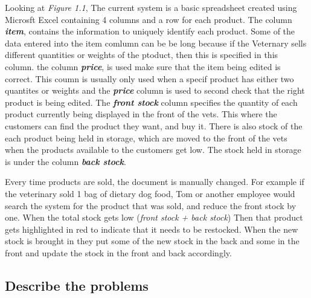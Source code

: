 \begin{flushleft}
Looking at \textit{Figure 1.1}, The current system is a basic spreadsheet created using Microsft Excel containing 4 columns and a row for each product. The column \textbf{\textit{item}}, contains the information to uniquely identify each product. Some of the data entered into the item comlumn can be be long because if the Veternary sells different quantities or weights of the ptoduct, then this is specified in this column. the column \textbf{\textit{price}}, is used make sure that the item being edited is correct. This coumn is usually only used when a specif product has either two quantites or weights and the \textbf{\textit{price}} column is used to second check that the right product is being edited. The \textbf{\textit{front stock}} column specifies the quantity of each product currently being displayed in the front of the vets. This where the customers can find the product they want, and buy it. There is also stock of the each product being held in storage, which are moved to the front of the vets when the products available to the customers get low. The stock held in storage is under the column \textbf{\textit{back stock}}. \par

Every time products are sold, the document is manually changed. For example if the veterinary sold 1 bag of dietary dog food, Tom or another employee would search the system for the product that was sold, and reduce the front stock by one. When the total stock gets low (\textit{front stock + back stock}) Then that product gets highlighted in red to indicate that it needs to be restocked. When the new stock is brought in they put some of the new stock in the back and some in the front and update the stock in the front and back accordingly. \par

\end{flushleft}

\subsection{Describe the problems}

